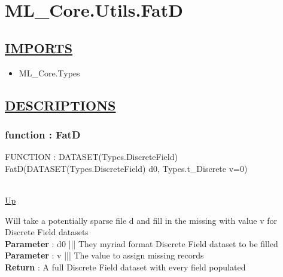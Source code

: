 \chapter*{ML\_Core.Utils.FatD}
\hypertarget{ML_Core.Utils.FatD}{}

\section*{\underline{IMPORTS}}
\begin{itemize}
\item ML\_Core.Types
\end{itemize}

\section*{\underline{DESCRIPTIONS}}
\subsection*{function : FatD}
\hypertarget{ecldoc:ml_core.utils.fatd}{FUNCTION : DATASET(Types.DiscreteField) FatD(DATASET(Types.DiscreteField) d0, Types.t\_Discrete v=0)} \\
\hyperlink{ecldoc:}{Up} \\
\par
Will take a potentially sparse file d and fill in the missing with value v for Discrete Field datasets \\
\textbf{Parameter} : d0 ||| They myriad format Discrete Field dataset to be filled \\
\textbf{Parameter} : v ||| The value to assign missing records \\
\textbf{Return} : A full Discrete Field dataset with every field populated \\
